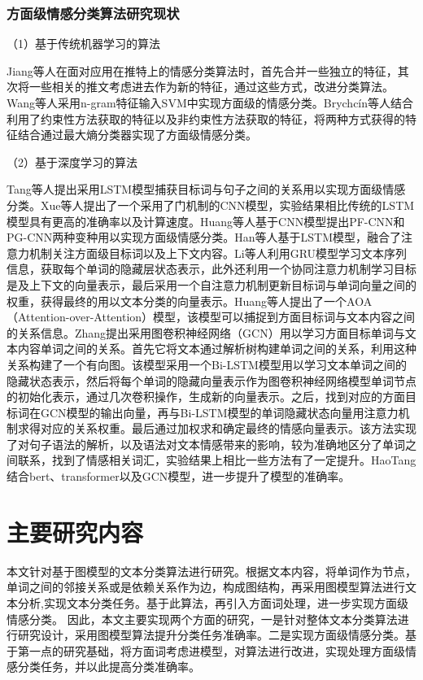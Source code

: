 \subsubsection{方面级情感分类算法研究现状}
（1）基于传统机器学习的算法

Jiang等人在面对应用在推特上的情感分类算法时，首先合并一些独立的特征，其次将一些相关的推文考虑进去作为新的特征，通过这些方式，改进分类算法。Wang等人采用n-gram特征输入SVM中实现方面级的情感分类。Brychcín等人结合利用了约束性方法获取的特征以及非约束性方法获取的特征，将两种方式获得的特征结合通过最大熵分类器实现了方面级情感分类。

（2）基于深度学习的算法

Tang等人提出采用LSTM模型捕获目标词与句子之间的关系用以实现方面级情感分类。Xue等人提出了一个采用了门机制的CNN模型，实验结果相比传统的LSTM模型具有更高的准确率以及计算速度。Huang等人基于CNN模型提出PF-CNN和PG-CNN两种变种用以实现方面级情感分类。Han等人基于LSTM模型，融合了注意力机制关注方面级目标词以及上下文内容。Li等人利用GRU模型学习文本序列信息，获取每个单词的隐藏层状态表示，此外还利用一个协同注意力机制学习目标是及上下文的向量表示，最后采用一个自注意力机制更新目标词与单词向量之间的权重，获得最终的用以文本分类的向量表示。Huang等人提出了一个AOA（Attention-over-Attention）模型，该模型可以捕捉到方面目标词与文本内容之间的关系信息。Zhang提出采用图卷积神经网络（GCN）用以学习方面目标单词与文本内容单词之间的关系。首先它将文本通过解析树构建单词之间的关系，利用这种关系构建了一个有向图。该模型采用一个Bi-LSTM模型用以学习文本单词之间的隐藏状态表示，然后将每个单词的隐藏向量表示作为图卷积神经网络模型单词节点的初始化表示，通过几次卷积操作，生成新的向量表示。之后，找到对应的方面目标词在GCN模型的输出向量，再与Bi-LSTM模型的单词隐藏状态向量用注意力机制求得对应的关系权重。最后通过加权求和确定最终的情感向量表示。该方法实现了对句子语法的解析，以及语法对文本情感带来的影响，较为准确地区分了单词之间联系，找到了情感相关词汇，实验结果上相比一些方法有了一定提升。HaoTang结合bert、transformer以及GCN模型，进一步提升了模型的准确率。

\section{主要研究内容}
本文针对基于图模型的文本分类算法进行研究。根据文本内容，将单词作为节点，单词之间的邻接关系或是依赖关系作为边，构成图结构，再采用图模型算法进行文本分析,实现文本分类任务。基于此算法，再引入方面词处理，进一步实现方面级情感分类。
因此，本文主要实现两个方面的研究，一是针对整体文本分类算法进行研究设计，采用图模型算法提升分类任务准确率。二是实现方面级情感分类。基于第一点的研究基础，将方面词考虑进模型，对算法进行改进，实现处理方面级情感分类任务，并以此提高分类准确率。
